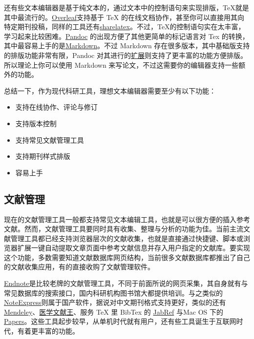\documentclass[]{tufte-book}
\providecommand{\tightlist}{%
  \setlength{\itemsep}{0pt}\setlength{\parskip}{0pt}}
\begin{document}
还有些文本编辑器是基于纯文本的，通过文本中的控制语句来实现排版，TeX就是其中最流行的。\href{https://www.overleaf.com/}{Overleaf}支持基于 TeX 的在线文档协作，甚至你可以直接用其向特定期刊投稿，同样的工具还有\href{https://www.sharelatex.com/}{sharelatex}。不过，TeX的控制语句实在太丰富，学习起来比较困难。\href{https://pandoc.org/}{Pandoc} 的出现方便了其他更简单的标记语言对 Tex 的转换，其中最容易上手的是\href{https://daringfireball.net/projects/markdown/}{Markdown}。不过 Markdown 存在很多版本，其中基础版支持的排版功能非常有限，Pandoc 对其进行的\href{https://pandoc.org/MANUAL.html\#pandocs-markdown}{扩展}则支持了更丰富的功能方便排版。所以理论上你可以使用 Markdown 来写论文，不过这需要你的编辑器支持一些额外的功能。

总结一下，作为现代科研工具，理想文本编辑器需要至少有以下功能：

\begin{itemize}
\tightlist
\item
  支持在线协作、评论与修订
\item
  支持版本控制
\item
  支持常见文献管理工具
\item
  支持期刊样式排版
\item
  容易上手
\end{itemize}

\hypertarget{ux6587ux732eux7ba1ux7406-1}{%
\subsection*{文献管理}\label{ux6587ux732eux7ba1ux7406-1}}

现在的文献管理工具一般都支持常见文本编辑工具，也就是可以很方便的插入参考文献。然而，文献管理工具要同时具有收集、整理与分析的功能为佳。当前主流文献管理工具都已经支持浏览器层次的文献收集，也就是直接通过快捷键、脚本或浏览器扩展一键自动提取文章页面中参考文献信息并存入用户指定的文献库。要实现这个功能，多数需要知道文献数据库网页结构，当前很多文献数据库都推出了自己的文献收集应用，有的直接收购了文献管理软件。

\href{https://endnote.com/}{Endnote}是比较老牌的文献管理工具，不同于前面所说的网页采集，其自身就有与常见数据库的搜索接口，国内科研机构图书馆大都提供培训。与之类似的\href{http://www.inoteexpress.com/aegean/}{NoteExpress}则属于国产软件，据说对中文期刊格式支持更好，类似的还有\href{https://www.mendeley.com/}{Mendeley}、\href{http://refer.medlive.cn/}{医学文献王}、服务 TeX 里 BibTex 的 \href{http://www.jabref.org/}{JabRef} 与Mac OS 下的\href{https://www.readcube.com/papers/mac}{Papers}。这些工具起步较早，从单机时代就有用户，还有些工具诞生于互联网时代，有着更丰富的功能。
\end{document}
